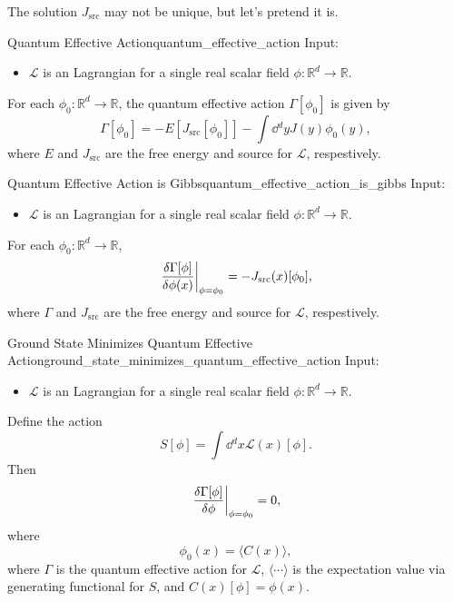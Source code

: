 \documentclass{article}
\begin{document}
The solution $J_{\mathrm{src}}$ may not be unique, but let's pretend it is.

\begin{definition}{Quantum Effective Action}{quantum_effective_action}
    Input:
    \begin{itemize}
        \item $\mathcal{L}$ is an Lagrangian for a single real scalar field $\phi: \mathbb{R}^d \rightarrow \mathbb{R}$.
    \end{itemize}
    For each $\phi_0: \mathbb{R}^d \rightarrow \mathbb{R}$, the quantum effective action $\Gamma[\phi_0]$ is given by
    \[ \Gamma[\phi_0] = -E[J_{\mathrm{src}}[\phi_0]] - \int \dd{^d y} J(y) \phi_{0}(y), \]
    where $E$ and $J_{\mathrm{src}}$ are the free energy and source for $\mathcal{L}$, respestively.
\end{definition}

\begin{theorem}{Quantum Effective Action is Gibbs}{quantum_effective_action_is_gibbs}
    Input:
    \begin{itemize}
        \item $\mathcal{L}$ is an Lagrangian for a single real scalar field $\phi: \mathbb{R}^d \rightarrow \mathbb{R}$.
    \end{itemize}
    For each $\phi_0: \mathbb{R}^d \rightarrow \mathbb{R}$,
    \[ \eval{\frac{\delta \Gamma[\phi]}{\delta \phi(x)}}_{\phi = \phi_0} = -J_{\mathrm{src}}(x)[\phi_0], \]
    where $\Gamma$ and $J_{\mathrm{src}}$ are the free energy and source for $\mathcal{L}$, respestively.
\end{theorem}

\begin{corollary}{Ground State Minimizes Quantum Effective Action}{ground_state_minimizes_quantum_effective_action}
    Input:
    \begin{itemize}
        \item $\mathcal{L}$ is an Lagrangian for a single real scalar field $\phi: \mathbb{R}^d \rightarrow \mathbb{R}$.
    \end{itemize}
    Define the action
    \[ S[\phi] = \int \dd{^d x} \mathcal{L}(x)[\phi]. \]
    Then
    \[ \eval{\frac{\delta \Gamma[\phi]}{\delta \phi}}_{\phi = \phi_0} = 0, \]
    where
    \[ \phi_0(x) = \langle C(x) \rangle, \]
    where $\Gamma$ is the quantum effective action for $\mathcal{L}$, $\langle \cdots \rangle$ is the expectation value via generating functional for $S$, and $C(x)[\phi] = \phi(x)$.
\end{corollary}
\end{document}
